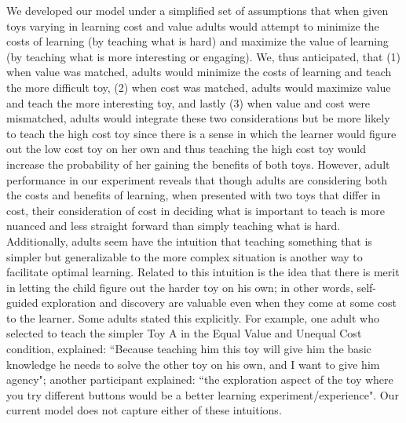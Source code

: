 \documentclass[10pt,letterpaper]{article}
\begin{document}
We developed our model under a simplified set of assumptions that when given toys varying in learning cost and value adults would attempt to minimize the costs of learning (by teaching what is hard) and maximize the value of learning (by teaching what is more interesting or engaging). We, thus anticipated, that (1) when value was matched, adults would minimize the costs of learning and teach the more difficult toy, (2) when cost was matched, adults would maximize value and teach the more interesting toy, and lastly (3) when value and cost were mismatched, adults would integrate these two considerations but be more likely to teach the high cost toy since there is a sense in which the learner would figure out the low cost toy on her own and thus teaching the high cost toy would increase the probability of her gaining the benefits of both toys. However, adult performance in our experiment reveals that though adults are considering both the costs and benefits of learning, when presented with two toys that differ in cost, their consideration of cost in deciding what is important to teach is more nuanced and less straight forward than simply teaching what is hard. Additionally, adults seem have the intuition that teaching something that is simpler but generalizable to the more complex situation is another way to facilitate optimal learning. Related to this intuition is the idea that there is merit in letting the child figure out the harder toy on his own; in other words, self-guided exploration and discovery are valuable even when they come at some cost to the learner. Some adults stated this explicitly. For example, one adult who selected to teach the simpler Toy A in the Equal Value and Unequal Cost condition, explained: ``Because teaching him this toy will give him the basic knowledge he needs to solve the other toy on his own, and I want to give him agency"; another participant explained: ``the exploration aspect of the toy where you try different buttons would be a better learning experiment/experience". Our current model does not capture either of these intuitions.
\end{document}
